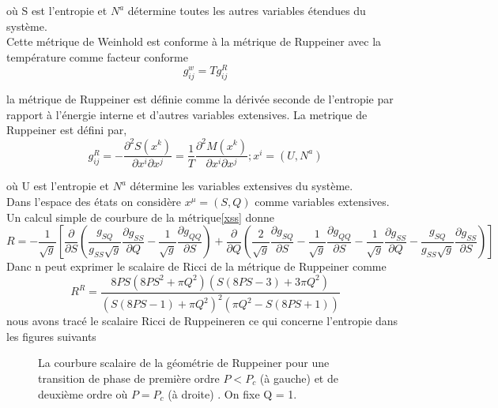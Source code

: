 où S est l'entropie et $N^{a}$ détermine toutes les autres variables étendues du système.\\
Cette métrique de Weinhold est conforme à la métrique de Ruppeiner 
avec  la température comme facteur conforme
\begin{equation}
g_{ij}^{w}= T g_{ij}^{R}
\end{equation}

la métrique de Ruppeiner \cite{53} est définie comme la dérivée seconde de l’entropie par rapport à l’énergie
interne et d’autres variables extensives. La metrique de Ruppeiner est défini par,
\begin{equation}
\label{xss}
g_{ij}^{R}=-\dfrac{\partial^{2}S(x^{k})}{\partial x^{i} \partial x^{j} }=\dfrac{1}{T}\dfrac{\partial^{2}M(x^{k})}{\partial x^{i} \partial x^{j} };  x^{i}=(U,N^{a}) 
\end{equation}

où U est l'entropie et $N^{a}$ détermine les variables extensives du système.\\
Dans l'espace des états on considère $x^{\mu} = (S, Q)$ comme variables extensives. Un calcul simple de courbure de la métrique\ref{xss} donne
\begin{equation}
R=-\dfrac{1}{\sqrt{g}}\left[\dfrac{\partial}{\partial S}\left( \dfrac{g_{SQ}}{g_{SS}\sqrt{g}}\dfrac{\partial g_{SS}}{\partial Q}-\dfrac{1}{\sqrt{g}}\dfrac{\partial g_{QQ}}{\partial S}\right)  +\dfrac{\partial}{\partial Q}\left( \dfrac{2}{\sqrt{g}}\dfrac{\partial g_{SQ}}{\partial S}-\dfrac{1}{\sqrt{g}}\dfrac{\partial g_{QQ}}{\partial S}-\dfrac{1}{\sqrt{g}}\dfrac{\partial g_{SS}}{\partial Q}-\dfrac{g_{SQ}}{g_{SS}\sqrt{g}}\dfrac{\partial g_{SS}}{\partial S}\right)\right] 
\end{equation}
Danc n peut exprimer le scalaire de Ricci de la  métrique de Ruppeiner  comme
\begin{equation}
R^{R}=\dfrac{8PS(8PS^{2}+\pi Q^{2})(S(8PS-3)+3\pi Q^{2})}{(S(8PS-1)+\pi Q^{2})^{2}(\pi Q^{2}-S(8PS+1))}
\end{equation}
nous avons tracé le scalaire  Ricci  de Ruppeineren ce qui concerne l'entropie dans les figures suivants\\

\begin{figure}[H]
\caption{La courbure scalaire de la géométrie de Ruppeiner pour une transition de phase
	de première ordre $P < P_{c}$ (à gauche) et de deuxième ordre où $P = P_{c}$ (à droite) . On fixe Q = 1.}
\end{figure} 

